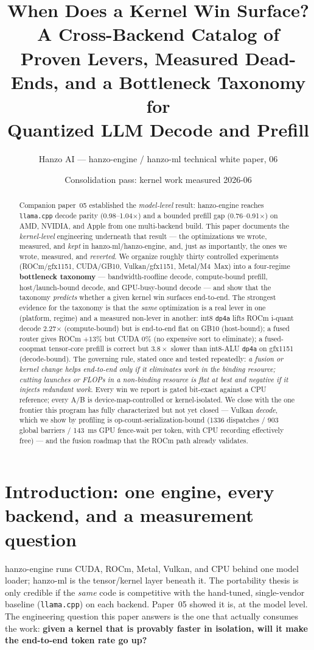 \documentclass[11pt]{article}
\title{\textbf{When Does a Kernel Win Surface? A Cross-Backend Catalog of\\
Proven Levers, Measured Dead-Ends, and a Bottleneck Taxonomy for\\
Quantized LLM Decode and Prefill}}
\author{Hanzo AI --- hanzo-engine / hanzo-ml technical white paper, 06}
\date{Consolidation pass: kernel work measured 2026-06}
\newcommand{\x}{\ensuremath{\times}}
\newcommand{\dpa}{\texttt{dp4a}}
\begin{document}
\maketitle

\begin{abstract}
Companion paper~05 established the \emph{model-level} result: hanzo-engine reaches
\texttt{llama.cpp} decode parity (0.98--1.04\x) and a bounded prefill gap (0.76--0.91\x) on
AMD, NVIDIA, and Apple from one multi-backend build. This paper documents the
\emph{kernel-level} engineering underneath that result --- the optimizations we wrote,
measured, and \emph{kept} in hanzo-ml/hanzo-engine, and, just as importantly, the ones we
wrote, measured, and \emph{reverted}. We organize roughly thirty controlled experiments
(ROCm/gfx1151, CUDA/GB10, Vulkan/gfx1151, Metal/M4~Max) into a four-regime
\textbf{bottleneck taxonomy} --- bandwidth-roofline decode, compute-bound prefill,
host/launch-bound decode, and GPU-busy-bound decode --- and show that the taxonomy
\emph{predicts} whether a given kernel win surfaces end-to-end. The strongest evidence for the
taxonomy is that the \emph{same} optimization is a real lever in one (platform, regime) and a
measured non-lever in another: int8 \dpa{} lifts ROCm i-quant decode 2.27\x{} (compute-bound) but
is end-to-end flat on GB10 (host-bound); a fused router gives ROCm $+13\%$ but CUDA $0\%$ (no
expensive sort to eliminate); a fused-coopmat tensor-core prefill is correct but $3.8\x$ slower
than int8-ALU \dpa{} on gfx1151 (decode-bound). The governing rule, stated once and tested
repeatedly: \emph{a fusion or kernel change helps end-to-end only if it eliminates work in the
binding resource; cutting launches or FLOPs in a non-binding resource is flat at best and
negative if it injects redundant work.} Every win we report is gated bit-exact against a CPU
reference; every A/B is device-map-controlled or kernel-isolated. We close with the one frontier
this program has fully characterized but not yet closed --- Vulkan \emph{decode}, which we show
by profiling is op-count-serialization-bound (1336 dispatches / 903 global barriers / 143~ms
GPU fence-wait per token, with CPU recording effectively free) --- and the fusion roadmap that
the ROCm path already validates.
\end{abstract}

\tableofcontents

\section{Introduction: one engine, every backend, and a measurement question}
hanzo-engine runs CUDA, ROCm, Metal, Vulkan, and CPU behind one model loader; hanzo-ml is the
tensor/kernel layer beneath it. The portability thesis is only credible if the \emph{same} code
is competitive with the hand-tuned, single-vendor baseline (\texttt{llama.cpp}) on each backend.
Paper~05 showed it is, at the model level. The engineering question this paper answers is the one
that actually consumes the work: \textbf{given a kernel that is provably faster in isolation, will
it make the end-to-end token rate go up?}
\end{document}
